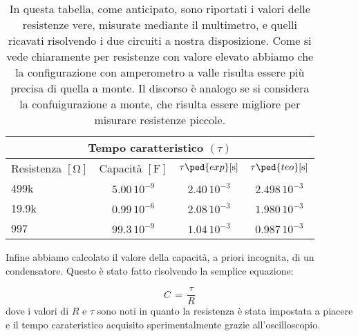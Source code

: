 \begin{SCtable}[0.5][H]
  \centering
  \begin{tabular}{l | c c c}
      \multicolumn{4}{c}{\textbf{Tempo caratteristico $(\tau)$}} \\
      \toprule
      Resistenza $[\si{\ohm}]$ & Capacità $[\si{\farad}]$ & $\tau\ped{exp} [\si{\second}]$ & $\tau\ped{teo} [\si{\second}]$ \\
      \midrule
      499k   &  $5.00\,10^{-9}$ 	& $2.40\,10^{-3}$ 	& $2.498\,10^{-3}$ \\
      19.9k  &  $0.99\,10^{-6}$ 	& $2.08\,10^{-3}$ 	& $1.980\,10^{-3}$ \\
      997    &  $99.3\,10^{-9}$ 	& $1.04\,10^{-3}$ 	& $0.987\,10^{-3}$ \\
      \bottomrule
  \end{tabular}
  \caption{In questa tabella, come anticipato, sono riportati i valori delle resistenze vere, misurate mediante il multimetro, e quelli ricavati risolvendo i due circuiti a nostra disposizione. Come si vede chiaramente per resistenze con valore elevato abbiamo che la configurazione con amperometro a valle risulta essere più precisa di quella a monte. Il discorso è analogo se si considera la confuigurazione a monte, che risulta essere migliore per misurare resistenze piccole.}
\end{SCtable}

Infine abbiamo calcolato il valore della capacità, a priori incognita, di un condensatore. Questo è stato fatto risolvendo la semplice equazione:

\begin{equation}
	C \,=\, \frac{\tau}{R}
\end{equation}
%
dove i valori di $R$ e $\tau$ sono noti in quanto la resistenza è stata impostata a piacere e il tempo carateristico acquisito sperimentalmente grazie all'oscilloscopio.
